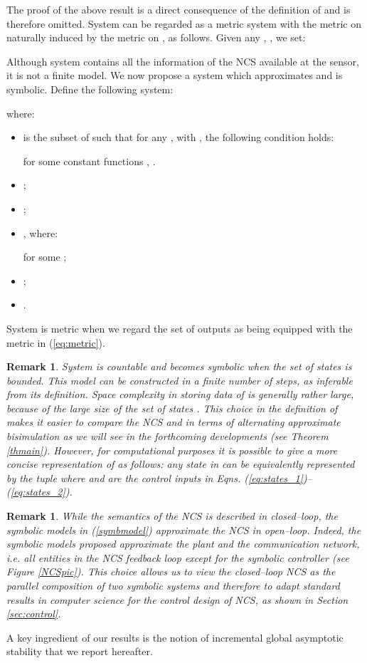 \documentclass{amsart}
\newtheorem{remark}[theorem]{Remark}
\begin{document}
The proof of the above result is a direct consequence of the definition of  and is therefore omitted. 
System  can be regarded as a metric system with the metric  on  naturally induced by the metric  on , as follows. Given any , , we set:


Although system  contains all the information of the NCS  available at the sensor, it is not a finite model. We now propose a system which approximates  and is symbolic. 
Define the following system:


where:

\begin{itemize}
\item  is the subset of  such that for any , with , the following condition holds:

for some constant functions , .

\item ;

\item ;

\item , where:

for some ;

\item ;
\item .
\end{itemize}

System  is metric when we regard the set of outputs  as being equipped with the metric in (\ref{eq:metric}).

\begin{remark}
System  is countable and becomes symbolic when the set of states  is bounded. 
This model can be constructed in a finite number of steps, as inferable from its definition. Space complexity in storing data of  is generally rather large, because of the large size of the set of states . This choice in the definition of  makes it easier to compare the NCS and  in terms of alternating approximate bisimulation as we will see in the forthcoming developments (see Theorem \ref{thmain}). However, for computational purposes it is possible to give a more concise representation of  as follows: any state  in  can be equivalently represented by the tuple  where  and  are the control inputs in Eqns. (\ref{eq:states_1})--(\ref{eq:states_2}). 
\end{remark}
\begin{remark}
While the semantics of the NCS  is described in closed--loop, the symbolic models in (\ref{symbmodel}) approximate the NCS in open--loop. Indeed, the symbolic models proposed approximate the plant  and the communication network, i.e. all entities in the NCS feedback loop except for the symbolic controller  (see Figure \ref{NCSpic}). This choice allows us to view the closed--loop NCS as the parallel composition \cite{ModelChecking} of two symbolic systems and therefore to adapt standard results in computer science for the control design of NCS, as shown in Section \ref{sec:control}. 
\end{remark}
A key ingredient of our results is the notion of incremental global
asymptotic stability that we report hereafter. 
\end{document}
